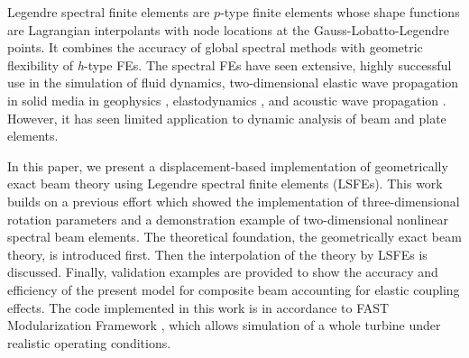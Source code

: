 Legendre spectral finite elements\cite{Patera:1984,Ronquist:1987} are
$p$-type finite elements whose shape functions are Lagrangian interpolants
with node locations at the Gauss-Lobatto-Legendre points. It combines the
accuracy of global spectral methods with geometric flexibility of {\it
h}-type FEs. The spectral FEs have seen extensive, highly successful use in
the simulation of fluid dynamics\cite{Ronquist:1987, Patera:1984,
Deville:2002}, two-dimensional elastic wave propagation in solid media in
geophysics \cite{Komatitsch:1998}, elastodynamics \cite{Sridhar:2006}, and
acoustic wave propagation \cite{Sprague:2004}. However, it has seen limited
application to dynamic analysis of
beam\cite{Ben-Tal-etal:1995,Ben-Tal-etal:1996,Kudela-etal:2007a,Sprague-Geers:2008}
and plate
elements\cite{Zrahia-Bar-Yoseph:1995, Kudela-etal:2007b,Sprague-Brito:2012}. 

In this paper, we present a displacement-based implementation of
geometrically exact beam theory using Legendre spectral finite elements
(LSFEs).  This work builds on a previous effort which showed the
implementation of three-dimensional rotation parameters\cite{Wang:GEBT2013}
and a demonstration example of two-dimensional nonlinear spectral beam
elements\cite{Wang:SFE2013}. The theoretical foundation, the geometrically
exact beam theory, is introduced first. Then the interpolation of the theory by LSFEs is discussed. Finally, validation examples are provided to show the accuracy and
efficiency of the present model for composite beam accounting for elastic coupling effects. The code implemented in this work is in accordance to FAST Modularization Framework
\cite{Jonkman:2013},  which allows simulation of a whole turbine under
realistic operating conditions.

